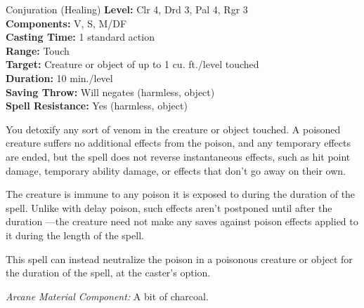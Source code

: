 {Conjuration (Healing)}
{
	\textbf{Level:}
	Clr 4, Drd 3, Pal 4, Rgr 3\\
	\textbf{Components:}
	V, S, M/DF\\
	\textbf{Casting Time:}
	1 standard action\\
	\textbf{Range:}
	Touch\\
	\textbf{Target:}
	Creature or object of up to 1 cu. ft./level touched\\
	\textbf{Duration:}
	10 min./level\\
	\textbf{Saving Throw:}
	Will negates (harmless, object)\\
	\textbf{Spell Resistance:}
	Yes (harmless, object)\\
}
{
	You detoxify any sort of venom in the creature or object touched. A poisoned creature suffers no additional effects from the poison, and any temporary effects are ended, but the spell does not reverse instantaneous effects, such as hit point damage, temporary ability damage, or effects that don't go away on their own.

	The creature is immune to any poison it is exposed to during the duration of the spell. Unlike with delay poison, such effects aren't postponed until after the duration ---the creature need not make any saves against poison effects applied to it during the length of the spell.

	This spell can instead neutralize the poison in a poisonous creature or object for the duration of the spell, at the caster's option.

	\textit{Arcane Material Component:}
	A bit of charcoal.

}

